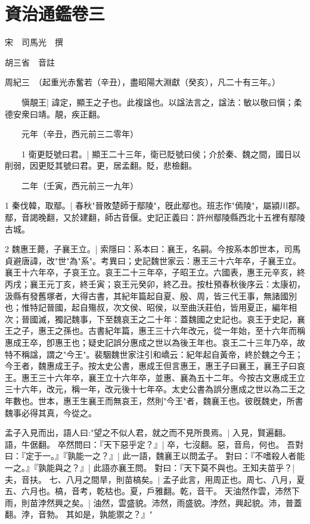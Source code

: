 \chapter{資治通鑑卷三}

宋　司馬光　撰

胡三省　音註

周紀三　（起重光赤奮若（辛丑），盡昭陽大淵獻（癸亥），凡二十有三年。）

　　愼靚王|{
	諱定，顯王之子也。此複諡也。以諡法言之，諡法：敏以敬曰愼；柔德安衆曰靖。靚，疾正翻。
	}


　　元年（辛丑，西元前三二零年）

　　1 衛更貶號曰君。|{
	顯王二十三年，衛已貶號曰侯；介於秦、魏之間，國日以削弱，因更貶其號曰君。更，居孟翻。貶，悲檢翻。
	}

　　二年（壬寅，西元前三一九年）

1 秦伐韓，取鄢。|{
	春秋"晉敗楚師于鄢陵"，旣此鄢也。班志作"傿陵"，屬潁川郡。鄢，音謁晚翻，又於建翻，師古音偃。史記正義曰：許州鄢陵縣西北十五裡有鄢陵古城。
	}

2 魏惠王薨，子襄王立。|{
	索隱曰：系本曰：襄王，名嗣。今按系本卽世本，司馬貞避唐諱，改"世"為"系"。考異曰；史記魏世家云：惠王三十六年卒，子襄王立。襄王十六年卒，子哀王立。哀王二十三年卒，子昭王立。六國表，惠王元辛亥，終丙戌；襄王元丁亥，終壬寅；哀王元癸卯，終乙丑。按杜預春秋後序云：太康初，汲縣有發舊塚者，大得古書，其紀年篇起自夏、殷、周，皆三代王事，無諸國別也；惟特記晉國，起自殤叔，次文侯、昭侯，以至曲沃莊伯，皆用夏正，編年相次；晉國滅，獨記魏事，下至魏哀王之二十年：蓋魏國之史記也。哀王于史記，襄王之子，惠王之孫也。古書紀年篇，惠王三十六年改元，從一年始，至十六年而稱惠成王卒，卽惠王也；疑史記誤分惠成之世以為後王年也。哀王二十三年乃卒，故特不稱諡，謂之"今王"。裴駰魏世家注引和嶠云：紀年起自黃帝，終於魏之今王；今王者，魏惠成王子。按太史公書，惠成王但言惠王，惠王子曰襄王，襄王子曰哀王。惠王三十六年卒，襄王立十六年卒，並惠、襄為五十二年。今按古文惠成王立三十六年，改元，稱一年，改元後十七年卒。太史公書為誤分惠成之世以為二王之年數也。世本，惠王生襄王而無哀王，然則"今王"者，魏襄王也。彼旣魏史，所書魏事必得其真，今從之。
	}

	孟子入見而出，語人曰:"望之不似人君，就之而不見所畏焉。|{
	入見，賢遍翻。語，牛倨翻。
	}
卒然問曰：『天下惡乎定？』|{
	卒，七沒翻。惡，音烏，何也。
	}
吾對曰：『定于一。』『孰能一之？』|{
	此一語，魏襄王以問孟子。
	}
對曰：『不嗜殺人者能一之。』『孰能與之？』|{
	此語亦襄王問。
	}
對曰：『天下莫不與也。王知夫苗乎？|{
	夫，音扶。
	}
七、八月之間旱，則苗槁矣。|{
	孟子此言，用周正也。周七、八月，夏五、六月也。槁，音考，乾枯也。夏，戶雅翻。乾，音干。
	}
天油然作雲，沛然下雨，則苗浡然興之矣。|{
	油然，雲盛貌。沛然，雨盛貌。浡然，興起貌。沛，普蓋翻。浡，音勃。
	}
其如是，孰能禦之？』"


